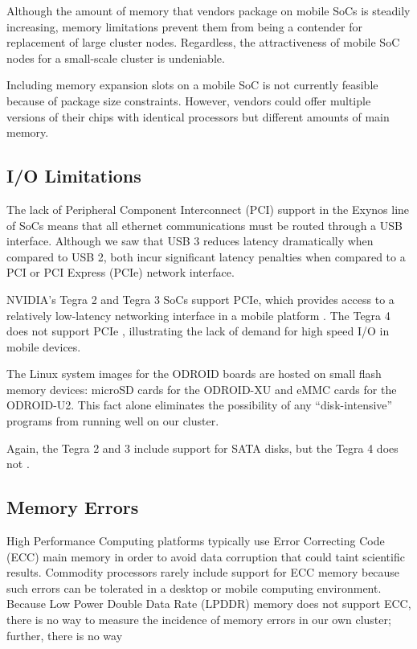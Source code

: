 \documentclass[11pt]{book}
\begin{document}
Although the amount of memory that vendors package on mobile SoCs is steadily
increasing, memory limitations prevent them from being a contender for
replacement of large cluster nodes. Regardless, the attractiveness of mobile SoC
nodes for a small-scale cluster is undeniable.

Including memory expansion slots on a mobile SoC is not currently feasible
because of package size constraints. However, vendors could offer multiple
versions of their chips with identical processors but different amounts of main
memory.

\subsection{I/O Limitations}

The lack of Peripheral Component Interconnect (PCI) support in the Exynos line
of SoCs means that all ethernet communications must be routed through a USB
interface. Although we saw that USB 3 reduces latency dramatically when compared
to USB 2, both incur significant latency penalties when compared to a PCI or PCI
Express (PCIe) network interface.

NVIDIA's Tegra 2 and Tegra 3 SoCs support PCIe, which provides access to a
relatively low-latency networking interface in a mobile platform
\cite{rajovic-13}. The Tegra 4 does not support PCIe \cite{arstch-tegra},
illustrating the lack of demand for high speed I/O in mobile devices.

The Linux system images for the ODROID boards are hosted on small flash memory
devices: microSD cards for the ODROID-XU and eMMC cards for the ODROID-U2. This
fact alone eliminates the possibility of any ``disk-intensive'' programs from
running well on our cluster.

Again, the Tegra 2 and 3 include support for SATA disks, but the Tegra 4 does
not \cite{arstch-tegra}.

\subsection{Memory Errors}

High Performance Computing platforms typically use Error Correcting Code (ECC)
main memory in order to avoid data corruption that could taint scientific
results. Commodity processors rarely include support for ECC memory because such
errors can be tolerated in a desktop or mobile computing environment. Because
Low Power Double Data Rate (LPDDR) memory does not support ECC, there is no way
to measure the incidence of memory errors in our own cluster; further, there is
no way
\end{document}
